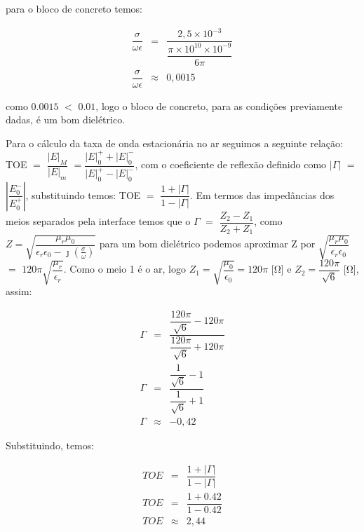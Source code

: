 \begin{enumerate}[1.]
para o bloco de concreto temos:

\begin{eqnarray*}
  \dfrac{\sigma}{\omega \epsilon} & = & \dfrac{2,5 \times 10^{-3}}{\dfrac{\pi \times 10^{10} \times 10^{-9}}{6\pi}} \nonumber \\
  \dfrac{\sigma}{\omega \epsilon} & \approx & 0,0015 \nonumber
\end{eqnarray*}

como $0.0015$ $<$ $0.01$, logo o bloco de concreto, para as condições previamente dadas, é um bom dielétrico.

Para o cálculo da taxa de onda estacionária no ar seguimos a seguinte relação: TOE $=$ $\dfrac{|E|_{M}}{|E|_{m}}$ $=$$\dfrac{|E|^{+}_{0} + |E|^{-}_{0}}{|E|^{+}_{0} - |E|^{-}_{0}}$, com o coeficiente de reflexão definido como $|\Gamma|$ $=$ $\left|\dfrac{E^{-}_{0}}{E^{+}_{0}}\right|$, substituindo temos: TOE $=$ $\dfrac{1 + |\Gamma|}{1 - |\Gamma|}$. Em termos das impedâncias dos meios separados pela interface temos que o $\Gamma$ $=$ $\dfrac{Z_{2} - Z_{1}}{Z_{2} + Z_{1}}$, como $Z = \sqrt{\dfrac{\mu_{r}\mu_{0}}{\epsilon_{r}\epsilon_{0} - \jmath \left(\frac{\sigma}{\omega}\right)}}$  para um bom dielétrico podemos aproximar Z por $\sqrt{\dfrac{\mu_{r}\mu_{0}}{\epsilon_{r}\epsilon_{0}}}$ $=$ $120\pi \sqrt{\dfrac{\mu_{r}}{\epsilon_{r}}}$.  Como o meio 1 é o ar, logo $Z_{1} = \sqrt{\dfrac{\mu_{0}}{\epsilon_{0}}} =120\pi$ [\si{\ohm}] e $Z_{2} = \dfrac{120\pi}{\sqrt{6}}$ [\si{\ohm}], assim:

\begin{eqnarray*}
  \Gamma & = & \dfrac{\dfrac{120\pi}{\sqrt{6}} - 120\pi}{\dfrac{120\pi}{\sqrt{6}} + 120\pi} \nonumber \\
  \Gamma & = &\dfrac{\dfrac{1}{\sqrt{6}} - 1}{\dfrac{1}{\sqrt{6}} + 1} \nonumber \\
  \Gamma & \approx & -0,42 \nonumber
\end{eqnarray*}

Substituindo, temos:

\begin{eqnarray*}
  TOE & = & \dfrac{1 + |\Gamma|}{1 - |\Gamma|} \nonumber \\
  TOE & = & \dfrac{1 + 0.42}{1 - 0.42} \nonumber \\
  TOE & \approx & 2,44
\end{eqnarray*}


\end{enumerate}
